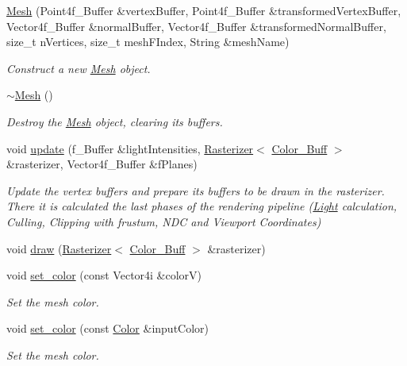 \begin{DoxyCompactItemize}
\item 
\mbox{\hyperlink{classprzurro_1_1_mesh_a63f4bc0dada8254f00a1e1d7cdae13a5}{Mesh}} (Point4f\+\_\+\+Buffer \&vertex\+Buffer, Point4f\+\_\+\+Buffer \&transformed\+Vertex\+Buffer, Vector4f\+\_\+\+Buffer \&normal\+Buffer, Vector4f\+\_\+\+Buffer \&transformed\+Normal\+Buffer, size\+\_\+t n\+Vertices, size\+\_\+t mesh\+F\+Index, String \&mesh\+Name)
\begin{DoxyCompactList}\small\item\em Construct a new \mbox{\hyperlink{classprzurro_1_1_mesh}{Mesh}} object. \end{DoxyCompactList}\item 
\mbox{\hyperlink{classprzurro_1_1_mesh_ab6130f009818dbae0e61d6014e963b01}{$\sim$\+Mesh}} ()
\begin{DoxyCompactList}\small\item\em Destroy the \mbox{\hyperlink{classprzurro_1_1_mesh}{Mesh}} object, clearing it\textquotesingle{}s buffers. \end{DoxyCompactList}\item 
void \mbox{\hyperlink{classprzurro_1_1_mesh_a37e8a0e37c37c140bcc5208a95add6c4}{update}} (f\+\_\+\+Buffer \&light\+Intensities, \mbox{\hyperlink{classprzurro_1_1_rasterizer}{Rasterizer}}$<$ \mbox{\hyperlink{classprzurro_1_1_color___buffer___rgba8888}{Color\+\_\+\+Buff}} $>$ \&rasterizer, Vector4f\+\_\+\+Buffer \&f\+Planes)
\begin{DoxyCompactList}\small\item\em Update the vertex buffers and prepare it\textquotesingle{}s buffers to be drawn in the rasterizer. There it is calculated the last phases of the rendering pipeline (\mbox{\hyperlink{classprzurro_1_1_light}{Light}} calculation, Culling, Clipping with frustum, N\+DC and Viewport Coordinates) \end{DoxyCompactList}\item 
void \mbox{\hyperlink{classprzurro_1_1_mesh_a15a924f0e1e05969dccea6f8903e2ad0}{draw}} (\mbox{\hyperlink{classprzurro_1_1_rasterizer}{Rasterizer}}$<$ \mbox{\hyperlink{classprzurro_1_1_color___buffer___rgba8888}{Color\+\_\+\+Buff}} $>$ \&rasterizer)
\item 
void \mbox{\hyperlink{classprzurro_1_1_mesh_a18662164729447fde86564e53f34f8f9}{set\+\_\+color}} (const Vector4i \&colorV)
\begin{DoxyCompactList}\small\item\em Set the mesh color. \end{DoxyCompactList}\item 
void \mbox{\hyperlink{classprzurro_1_1_mesh_af4fdc058dd872fa968d5bd1c01737605}{set\+\_\+color}} (const \mbox{\hyperlink{structprzurro_1_1_color___buffer___rgba8888_1_1_color}{Color}} \&input\+Color)
\begin{DoxyCompactList}\small\item\em Set the mesh color. \end{DoxyCompactList}\end{DoxyCompactItemize}


